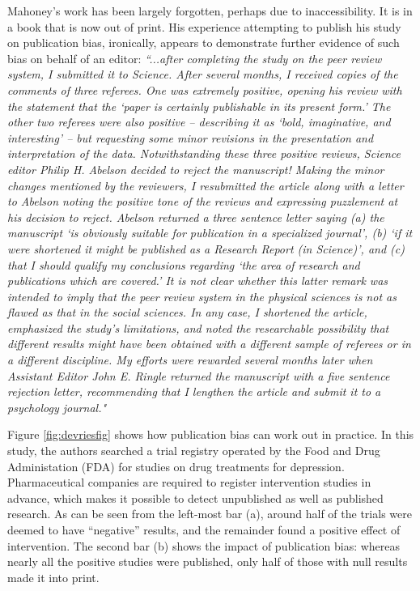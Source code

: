 \documentclass{krantz}
\begin{document}
\begin{tcolorbox}[colback=Black!5!lightgray,colframe=black!75!black,coltitle=white,title=Michael Mahoney: A man ahead of his time]\label{box:Mahoney}
Mahoney's work has been largely forgotten, perhaps due to inaccessibility. It is in a book that is now out of print. His experience attempting to publish his study on publication bias, ironically, appears to demonstrate further evidence of such bias on behalf of an editor:
\textit{``...after completing the study on the peer review system, I submitted it to Science. After several months, I received copies of the comments of three referees. One was extremely positive, opening his review with the statement that the `paper is certainly publishable in its present form.' The other two referees were also positive -- describing it as `bold, imaginative, and interesting' -- but requesting some minor revisions in the presentation and interpretation of the data. Notwithstanding these three positive reviews, Science editor Philip H. Abelson decided to reject the manuscript! Making the minor changes mentioned by the reviewers, I resubmitted the article along with a letter to Abelson noting the positive tone of the reviews and expressing puzzlement at his decision to reject. Abelson returned a three sentence letter saying (a) the manuscript `is obviously suitable for publication in a specialized journal', (b) `if it were shortened it might be published as a Research Report (in Science)', and (c) that I should qualify my conclusions regarding `the area of research and publications which are covered.' It is not clear whether this latter remark was intended to imply that the peer review system in the physical sciences is not as flawed as that in the social sciences. In any case, I shortened the article, emphasized the study's limitations, and noted the researchable possibility that different results might have been obtained with a different sample of referees or in a different discipline. My efforts were rewarded several months later when Assistant Editor John E. Ringle returned the manuscript with a five sentence rejection letter, recommending that I lengthen the article and submit it to a psychology journal."}

\end{tcolorbox}

Figure \ref{fig:devriesfig} shows how publication bias can work out in practice. In this study, the authors searched a trial registry operated by the Food and Drug Administation (FDA) for studies on drug treatments for depression. Pharmaceutical companies are required to register intervention studies in advance, which makes it possible to detect unpublished as well as published research. As can be seen from the left-most bar (a), around half of the trials were deemed to have ``negative'' results, and the remainder found a positive effect of intervention. The second bar (b) shows the impact of publication bias: whereas nearly all the positive studies were published, only half of those with null results made it into print.
\end{document}
